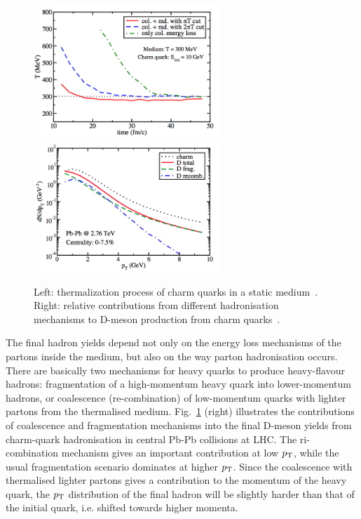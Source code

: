 \begin{figure}[!ht]
  \centering
  \includegraphics[width=7cm]{FigCap2/HFEnLoss3.png}
  \includegraphics[width=7cm]{FigCap2/FragHQ.png}
  \caption{Left: thermalization process of charm quarks in a static medium~\cite{Cao:2013ita}. Right: relative contributions from different hadronisation mechanisms to D-meson production from charm quarks~\cite{Cao:2013ita}.}
  \label{fig:HFEnLoss2}
\end{figure}



The final hadron yields depend not only on the energy loss 
mechanisms of the partons inside the medium,
but also on the way parton hadronisation occurs. There are basically 
two mechanisms for heavy quarks 
to produce heavy-flavour hadrons: fragmentation of a high-momentum 
heavy quark into lower-momentum
hadrons, or coalescence (re-combination) of low-momentum 
quarks with lighter partons from the thermalised
medium. Fig.~\ref{fig:HFEnLoss2} (right) illustrates the 
contributions of coalescence and fragmentation 
mechanisms into the final D-meson yields from charm-quark 
hadronisation in central Pb-Pb collisions at LHC. The ri-combination mechanism
gives an important contribution at low $p_{\rm T}$, while the usual 
fragmentation scenario dominates at higher $p_{\rm T}$.
Since the coalescence with thermalised lighter partons gives 
a contribution to the momentum of the 
heavy quark, the $p_{\rm T}$ distribution of the final hadron will be slightly 
harder than that of the initial quark,
i.e. shifted towards higher momenta.\\



